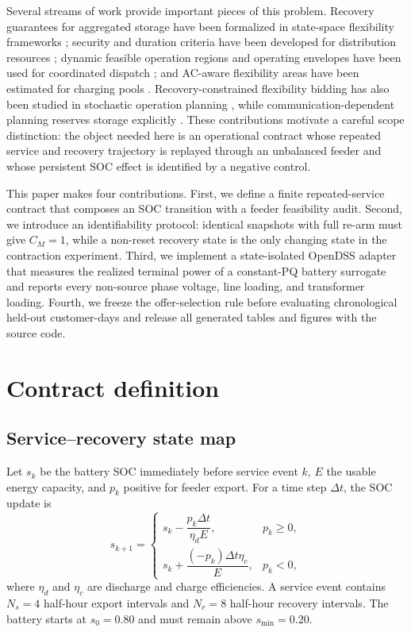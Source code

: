 \documentclass[11pt]{article}
\begin{document}
Several streams of work provide important pieces of this problem. Recovery guarantees for aggregated storage have been formalized in state-space flexibility frameworks \cite{Evans2022Recovery}; security and duration criteria have been developed for distribution resources \cite{Xiao2025SRC}; dynamic feasible operation regions and operating envelopes have been used for coordinated dispatch \cite{Cheng2026FOR,Lankeshwara2025DOE}; and AC-aware flexibility areas have been estimated for charging pools \cite{Giraldo2023RiskEV}. Recovery-constrained flexibility bidding has also been studied in stochastic operation planning \cite{Wanapinit2022FlexBidding}, while communication-dependent planning reserves storage explicitly \cite{Wang2026Communication}. These contributions motivate a careful scope distinction: the object needed here is an operational contract whose repeated service and recovery trajectory is replayed through an unbalanced feeder and whose persistent SOC effect is identified by a negative control.

This paper makes four contributions. First, we define a finite repeated-service contract that composes an SOC transition with a feeder feasibility audit. Second, we introduce an identifiability protocol: identical snapshots with full re-arm must give $C_M=1$, while a non-reset recovery state is the only changing state in the contraction experiment. Third, we implement a state-isolated OpenDSS adapter that measures the realized terminal power of a constant-PQ battery surrogate and reports every non-source phase voltage, line loading, and transformer loading. Fourth, we freeze the offer-selection rule before evaluating chronological held-out customer-days and release all generated tables and figures with the source code.

\section{Contract definition}
\subsection{Service--recovery state map}
Let $s_k$ be the battery SOC immediately before service event $k$, $E$ the usable energy capacity, and $p_k$ positive for feeder export. For a time step $\Delta t$, the SOC update is
\begin{equation}
s_{k+1}=\begin{cases}
s_k-\dfrac{p_k\Delta t}{\eta_d E}, & p_k\ge 0,\\[5pt]
s_k+\dfrac{(-p_k)\Delta t\eta_c}{E}, & p_k<0,
\end{cases}
\label{eq:soc}
\end{equation}
where $\eta_d$ and $\eta_c$ are discharge and charge efficiencies. A service event contains $N_s=4$ half-hour export intervals and $N_r=8$ half-hour recovery intervals. The battery starts at $s_0=0.80$ and must remain above $s_{\min}=0.20$.
\end{document}
